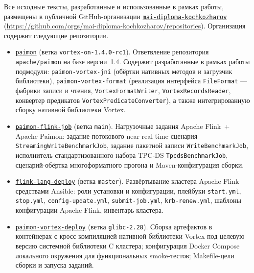
Все исходные тексты, разработанные и использованные в рамках работы, размещены в
публичной GitHub-организации
\href{https://github.com/orgs/mai-diploma-kochkozharov/repositories}{\texttt{mai-diploma-kochkozharov}}
(\url{https://github.com/orgs/mai-diploma-kochkozharov/repositories}).
Организация содержит следующие репозитории.

\begin{itemize}
    \item \href{https://github.com/mai-diploma-kochkozharov/paimon}{\texttt{paimon}}
        (ветка \texttt{vortex-on-1.4.0-rc1}). Ответвление репозитория
        \texttt{apache/paimon} на базе версии~1.4. Содержит разработанные в
        рамках работы подмодули: \texttt{paimon-vortex-jni} (обёртки нативных
        методов и загрузчик библиотеки), \texttt{paimon-vortex-format}
        (реализация интерфейса \texttt{FileFormat} --- фабрики записи и чтения,
        \texttt{VortexFormatWriter}, \texttt{VortexRecordsReader}, конвертер
        предикатов \texttt{VortexPredicateConverter}), а также интегрированную
        сборку нативной библиотеки Vortex.

    \item \href{https://github.com/mai-diploma-kochkozharov/paimon-flink-job}{\texttt{paimon-flink-job}}
        (ветка \texttt{main}). Нагрузочные задания Apache Flink~+ Apache Paimon:
        задание потокового near-real-time-сценария
        \texttt{StreamingWriteBenchmarkJob}, задание пакетной записи
        \texttt{WriteBenchmarkJob}, исполнитель стандартизованного набора TPC-DS
        \texttt{TpcdsBenchmarkJob}, сценарий-обёртка многоформатного прогона и
        Maven-конфигурация сборки.

    \item \href{https://github.com/mai-diploma-kochkozharov/flink-lang-deploy}{\texttt{flink-lang-deploy}}
        (ветка \texttt{master}). Развёртывание кластера Apache Flink средствами
        Ansible: роли установки и конфигурации, плейбуки
        \texttt{start.yml}, \texttt{stop.yml}, \texttt{config-update.yml},
        \texttt{submit-job.yml}, \texttt{krb-renew.yml}, шаблоны конфигурации
        Apache Flink, инвентарь кластера.

    \item \href{https://github.com/mai-diploma-kochkozharov/paimon-vortex-deploy}{\texttt{paimon-vortex-deploy}}
        (ветка \texttt{glibc-2.28}). Сборка артефактов в контейнерах с
        кросс-компиляцией нативной библиотеки Vortex под целевую версию
        системной библиотеки C кластера; конфигурация Docker Compose локального
        окружения для функциональных smoke-тестов; Makefile-цели сборки и
        запуска заданий.


\end{itemize}
